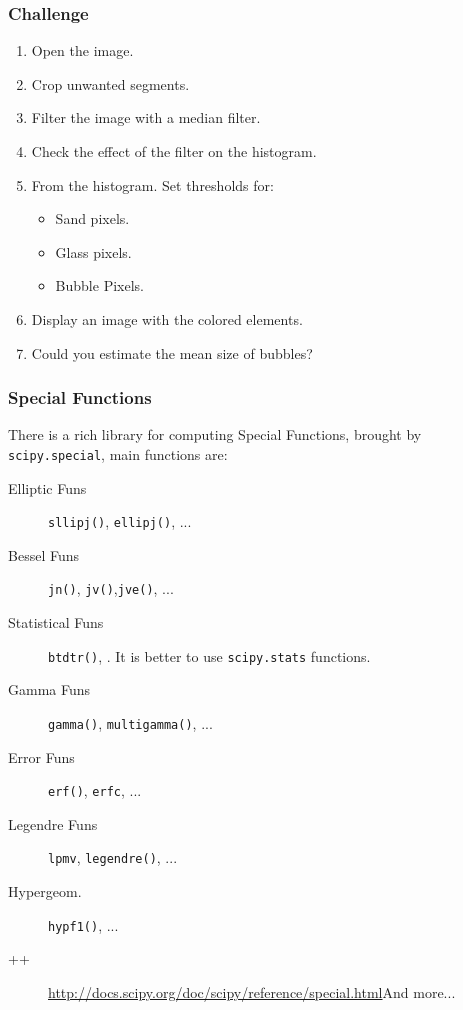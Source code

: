 \documentclass[10pt,colorlinks]{beamer}
\begin{document}
\begin{frame}[fragile]\frametitle{Challenge}
\begin{enumerate}
    \item Open the image.
    \item Crop unwanted segments.
    \item Filter the image with a median filter.
    \item Check the effect of the filter on the histogram.
    \item From the histogram. Set thresholds for:
    \begin{itemize}
        \item Sand pixels.
        \item Glass pixels.
        \item Bubble Pixels.
    \end{itemize}
    \item Display an image with the colored elements.
    \item Could you estimate the mean size of bubbles?
\end{enumerate}


\end{frame}



\begin{frame}[fragile]\frametitle{Special Functions}
There is a rich library for computing Special Functions, brought by \verb|scipy.special|, main functions are:

\begin{description}
    \item[Elliptic Funs] \verb|sllipj()|, \verb|ellipj()|, ...
    \item[Bessel Funs] \verb|jn()|, \verb|jv()|,\verb|jve()|, ... 
    \item[Statistical Funs] \verb|btdtr()|, \verb||. It is better to use \verb|scipy.stats| functions.
    \item[Gamma Funs] \verb|gamma()|, \verb|multigamma()|, ...
    \item[Error Funs] \verb|erf()|, \verb|erfc|, ...  
    \item[Legendre Funs] \verb|lpmv|, \verb|legendre()|, ...
    \item[Hypergeom.] \verb|hypf1()|, ...
    \item[++] \url{http://docs.scipy.org/doc/scipy/reference/special.html}{And more...}
\end{description}
\end{frame}
\end{document}
